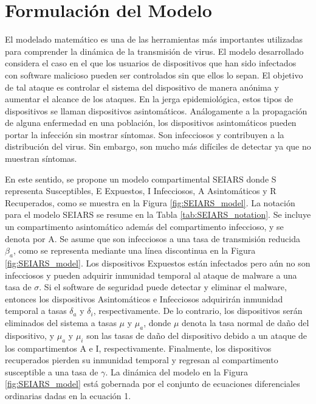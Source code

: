 

\section{Formulación del Modelo}
El modelado matemático es una de las herramientas más importantes utilizadas para comprender la dinámica de la transmisión de virus. El modelo desarrollado considera el caso en el que los usuarios de dispositivos que han sido infectados con software malicioso pueden ser controlados sin que ellos lo sepan. El objetivo de tal ataque es controlar el sistema del dispositivo de manera anónima y aumentar el alcance de los ataques. En la jerga epidemiológica, estos tipos de dispositivos se llaman dispositivos asintomáticos. Análogamente a la propagación de alguna enfermedad en una población, los dispositivos asintomáticos pueden portar la infección sin mostrar síntomas. Son infecciosos y contribuyen a la distribución del virus. Sin embargo, son mucho más difíciles de detectar ya que no muestran síntomas.

En este sentido, se propone un modelo compartimental SEIARS donde S representa Susceptibles, E Expuestos, I Infecciosos, A Asintomáticos y R Recuperados, como se muestra en la Figura \ref{fig:SEIARS_model}. La notación para el modelo SEIARS se resume en la Tabla \ref{tab:SEIARS_notation}. Se incluye un compartimento asintomático además del compartimento infeccioso, y se denota por A. Se asume que son infecciosos a una tasa de transmisión reducida $\beta_a$, como se representa mediante una línea discontinua en la Figura \ref{fig:SEIARS_model}. Los dispositivos Expuestos están infectados pero aún no son infecciosos y pueden adquirir inmunidad temporal al ataque de malware a una tasa de $\sigma$. Si el software de seguridad puede detectar y eliminar el malware, entonces los dispositivos Asintomáticos e Infecciosos adquirirán inmunidad temporal a tasas $\delta_a$ y $\delta_i$, respectivamente. De lo contrario, los dispositivos serán eliminados del sistema a tasas $\mu$ y $\mu_a$, donde $\mu$ denota la tasa normal de daño del dispositivo, y $\mu_a$ y $\mu_i$ son las tasas de daño del dispositivo debido a un ataque de los compartimentos A e I, respectivamente. Finalmente, los dispositivos recuperados pierden su inmunidad temporal y regresan al compartimento susceptible a una tasa de $\gamma$. La dinámica del modelo en la Figura \ref{fig:SEIARS_model} está gobernada por el conjunto de ecuaciones diferenciales ordinarias dadas en la ecuación 1.

